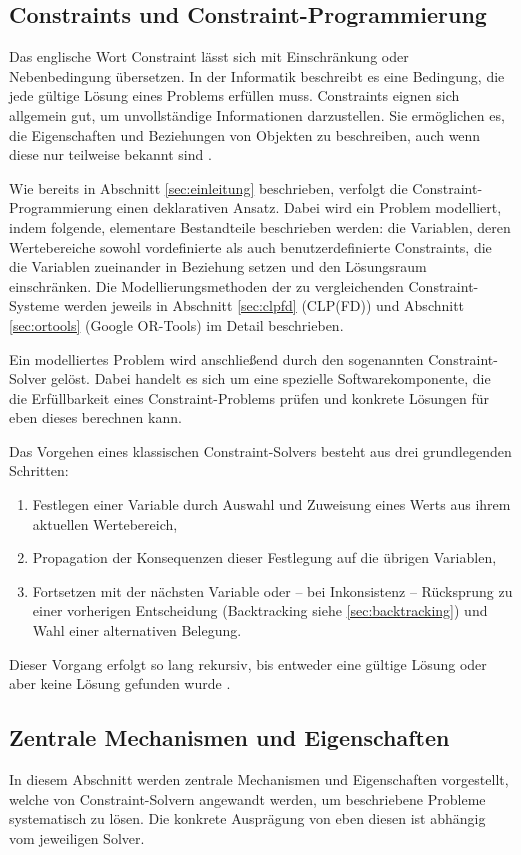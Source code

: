 \documentclass[12pt,a4paper]{article}
\begin{document}
\subsection{Constraints und Constraint-Programmierung}
Das englische Wort \glqq Constraint\grqq{} lässt sich mit Einschränkung oder Nebenbedingung übersetzen.
In der Informatik beschreibt es eine Bedingung, die jede gültige Lösung eines Problems erfüllen muss.
Constraints eignen sich allgemein gut, um unvollständige Informationen darzustellen.
Sie ermöglichen es, die Eigenschaften und Beziehungen von Objekten zu beschreiben, auch wenn diese nur teilweise bekannt sind \cite{clp_book}.

Wie bereits in Abschnitt \ref{sec:einleitung} beschrieben, verfolgt die Constraint-Programmierung einen deklarativen Ansatz.
Dabei wird ein Problem modelliert, indem folgende, elementare Bestandteile beschrieben werden: die Variablen, deren Wertebereiche sowohl vordefinierte als auch benutzerdefinierte Constraints, die die Variablen zueinander in Beziehung setzen und den Lösungsraum einschränken.
Die Modellierungsmethoden der zu vergleichenden Constraint-Systeme werden jeweils in Abschnitt \ref{sec:clpfd} (CLP(FD)) und Abschnitt \ref{sec:ortools} (Google OR-Tools) im Detail beschrieben. 

Ein modelliertes Problem wird anschließend durch den sogenannten Constraint-Solver gelöst.
Dabei handelt es sich um eine spezielle Softwarekomponente, die die Erfüllbarkeit eines Constraint-Problems prüfen und konkrete Lösungen für eben dieses berechnen kann.

\noindent
Das Vorgehen eines klassischen Constraint-Solvers besteht aus drei grundlegenden Schritten:
\begin{enumerate}
    \item Festlegen einer Variable durch Auswahl und Zuweisung eines Werts aus ihrem aktuellen Wertebereich,
    \item Propagation der Konsequenzen dieser Festlegung auf die übrigen Variablen,
    \item Fortsetzen mit der nächsten Variable oder -- bei Inkonsistenz -- Rücksprung zu einer vorherigen Entscheidung (Backtracking siehe \ref{sec:backtracking}) und Wahl einer alternativen Belegung.
\end{enumerate}
Dieser Vorgang erfolgt so lang rekursiv, bis entweder eine gültige Lösung oder aber keine Lösung gefunden wurde \cite{clp_book2}.
\subsection{Zentrale Mechanismen und Eigenschaften}
In diesem Abschnitt werden zentrale Mechanismen und Eigenschaften vorgestellt, welche von Constraint-Solvern angewandt werden, um beschriebene Probleme systematisch zu lösen. 
Die konkrete Ausprägung von eben diesen ist abhängig vom jeweiligen Solver.
\end{document}
